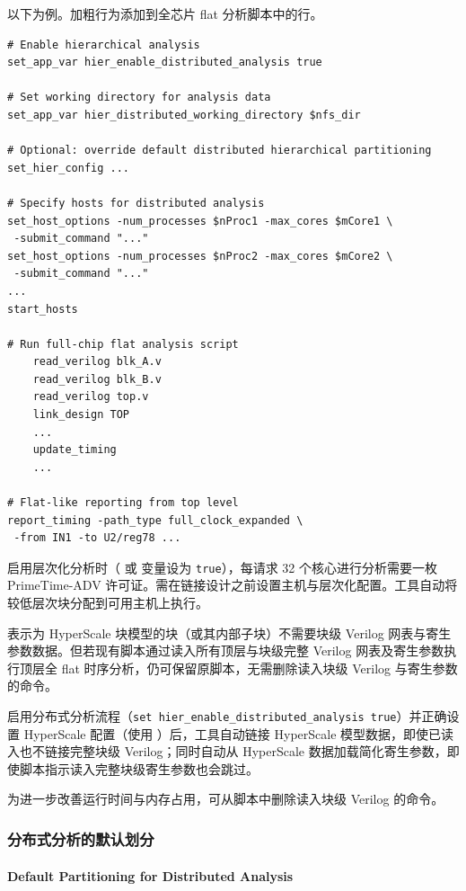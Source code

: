 以下为例。加粗行为添加到全芯片 flat 分析脚本中的行。
\begin{lstlisting}
# Enable hierarchical analysis
set_app_var hier_enable_distributed_analysis true

# Set working directory for analysis data
set_app_var hier_distributed_working_directory $nfs_dir

# Optional: override default distributed hierarchical partitioning
set_hier_config ...

# Specify hosts for distributed analysis
set_host_options -num_processes $nProc1 -max_cores $mCore1 \
 -submit_command "..."
set_host_options -num_processes $nProc2 -max_cores $mCore2 \
 -submit_command "..."
...
start_hosts

# Run full-chip flat analysis script
    read_verilog blk_A.v
    read_verilog blk_B.v
    read_verilog top.v
    link_design TOP
    ...
    update_timing
    ...

# Flat-like reporting from top level
report_timing -path_type full_clock_expanded \
 -from IN1 -to U2/reg78 ...
\end{lstlisting}

启用层次化分析时（ 或  变量设为 \texttt{true}），每请求 32 个核心进行分析需要一枚 PrimeTime-ADV 许可证。需在链接设计之前设置主机与层次化配置。工具自动将较低层次块分配到可用主机上执行。

表示为 HyperScale 块模型的块（或其内部子块）不需要块级 Verilog 网表与寄生参数数据。但若现有脚本通过读入所有顶层与块级完整 Verilog 网表及寄生参数执行顶层全 flat 时序分析，仍可保留原脚本，无需删除读入块级 Verilog 与寄生参数的命令。

启用分布式分析流程（\texttt{set hier\_enable\_distributed\_analysis true}）并正确设置 HyperScale 配置（使用 ）后，工具自动链接 HyperScale 模型数据，即使已读入也不链接完整块级 Verilog；同时自动从 HyperScale 数据加载简化寄生参数，即使脚本指示读入完整块级寄生参数也会跳过。

为进一步改善运行时间与内存占用，可从脚本中删除读入块级 Verilog 的命令。

\subsubsection{分布式分析的默认划分}
\paragraph*{Default Partitioning for Distributed Analysis}

